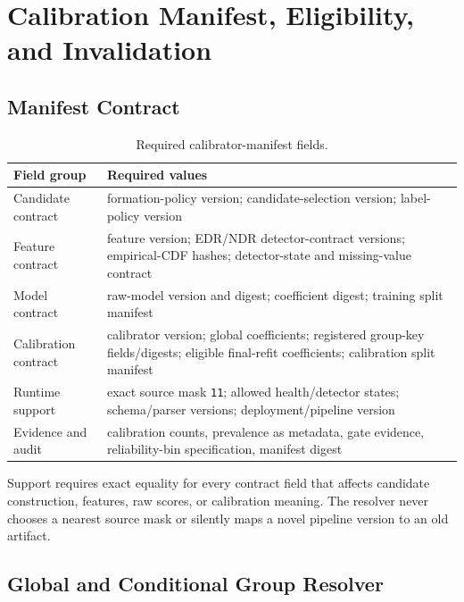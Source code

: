 \section{Calibration Manifest, Eligibility, and Invalidation}
\label{app:calibration-manifest}

\subsection{Manifest Contract}

\begin{table}[t]
\caption{Required calibrator-manifest fields.}
\label{tab:calibrator-manifest}
\centering
\scriptsize
\begin{tabular}{p{}p{}}
\toprule
\textbf{Field group} & \textbf{Required values} \\
\midrule
Candidate contract & formation-policy version; candidate-selection version; label-policy version \\
Feature contract & feature version; EDR/NDR detector-contract versions; empirical-CDF hashes; detector-state and missing-value contract \\
Model contract & raw-model version and digest; coefficient digest; training split manifest \\
Calibration contract & calibrator version; global coefficients; registered group-key fields/digests; eligible final-refit coefficients; calibration split manifest \\
Runtime support & exact source mask \texttt{11}; allowed health/detector states; schema/parser versions; deployment/pipeline version \\
Evidence and audit & calibration counts, prevalence as metadata, gate evidence, reliability-bin specification, manifest digest \\
\bottomrule
\end{tabular}
\end{table}

Support requires exact equality for every contract field that affects candidate construction,
features, raw scores, or calibration meaning. The resolver never chooses a nearest source mask
or silently maps a novel pipeline version to an old artifact.

\subsection{Global and Conditional Group Resolver}

